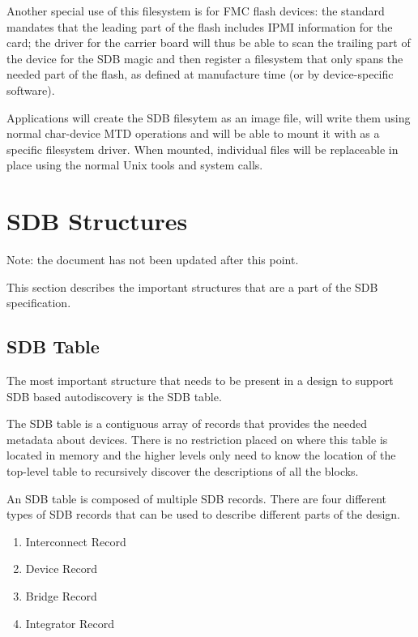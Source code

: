 \documentclass[a4paper, 12pt]{article}
\begin{document}
Another special use of this filesystem is for FMC flash devices: the
standard mandates that the leading part of the flash includes IPMI
information for the card; the driver for the carrier board will thus
be able to scan the trailing part of the device for the SDB magic and
then register a filesystem that only spans the needed part of the
flash, as defined at manufacture time (or by device-specific
software).

Applications will create the SDB filesytem as an image file, will
write them using normal char-device MTD operations and will be able to
mount it with as a specific filesystem driver. When mounted,
individual files will be replaceable in place using the normal Unix
tools and system calls.



\section{SDB Structures}


Note: the document has not been updated after this point.
\vfill

This section describes the important structures that are a part of the SDB specification.

\subsection{SDB Table}

The most important structure that needs to be present in a design to support SDB
based autodiscovery is the SDB table.

The SDB table is a contiguous array of records that provides the needed metadata
about devices. There is no restriction placed on where this table is located in
memory and the higher levels only need to know the location of the top-level table
to recursively discover the descriptions of all the blocks.

An SDB table is composed of multiple SDB records. There are four different types of
SDB records that can be used to describe different parts of the design.

\begin{enumerate}
\item Interconnect Record
\item Device Record
\item Bridge Record
\item Integrator Record
\end{enumerate}
\end{document}
